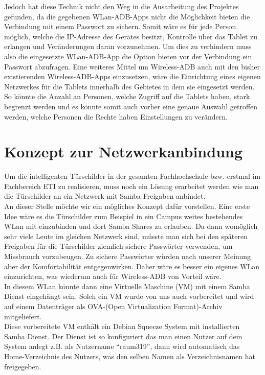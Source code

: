 \begin{flushleft}
Jedoch hat diese Technik nicht den Weg in die Ausarbeitung des Projektes gefunden, da die gegebenen WLan-ADB-Apps nicht die Möglichkeit bieten die Verbindung mit einem Passwort zu sichern. Somit wäre es für jede Person möglich, welche die IP-Adresse des Gerätes besitzt, Kontrolle über das Tablet zu erlangen und Veränderungen daran vorzunehmen. Um dies zu verhindern muss also die eingesetzte WLan-ADB-App die Option bieten vor der Verbindung ein Passwort abzufragen. Eine weiteres Mittel um Wireless-ADB auch mit den bisher existierenden Wireless-ADB-Apps einzusetzen, wäre die Einrichtung eines eigenen Netzwerkes für die Tablets innerhalb des Gebietes in dem sie eingesetzt werden. So könnte die Anzahl an Personen, welche Zugriff auf die Tablets haben, stark begrenzt werden und es könnte somit auch vorher eine genaue Auswahl getroffen werden, welche Personen die Rechte haben Einstellungen zu verändern.

\section{Konzept zur Netzwerkanbindung}
Um die intelligenten Türschilder in der gesamten Fachhochschule bzw. erstmal im Fachbereich ETI zu realisieren, muss noch ein Lösung erarbeitet werden wie man die Türschilder an ein Netzwerk mit Samba Freigaben anbindet.\\

An dieser Stelle möchte wir ein mögliches Konzept dafür vorstellen. Eine erste Idee wäre es die Türschilder zum Beispiel in ein Campus weites bestehendes WLan mit einzubinden und dort Samba Shares zu erlauben. Da dann womöglich sehr viele Leute im gleichen Netzwerk sind, müsste man sich bei den späteren Freigaben für die Türschilder ziemlich sichere Passwörter verwenden, um Missbrauch vorzubeugen. Zu sichere Passwörter würden nach unserer Meinung aber der Komfortabilität entgegenwirken. Daher wäre es besser ein eigenes WLan einzurichten, was wiederum auch für Wireless-ADB von Vorteil wäre.\\

In diesem WLan könnte dann eine Virtuelle Maschine (VM) mit einem Samba Dienst eingehängt sein. Solch ein VM wurde von uns auch vorbereitet und wird auf einem Datenträger als OVA-(Open Virtualization Format)-Archiv mitgeliefert.\\

Diese vorbereitete VM enthält ein Debian Squeeze System mit installierten Samba Dienst. Der Dienst ist so konfiguriert das man einen Nutzer auf dem System anlegt z.B. als Nutzername ``raum319'', dann wird automatisch das Home-Verzeichnis des Nutzers, was den selben Namen als Verzeichnisnamen hat freigegeben.\\


\end{flushleft}
